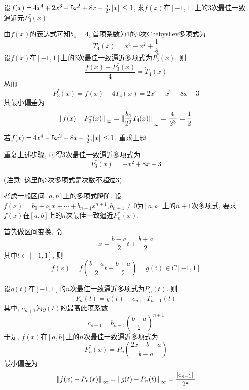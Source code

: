 \begin{example}
    设$f(x)=4x^4+2x^3-5x^2+8x-\frac{5}{2}, \abs*{x}\le 1$, 求$f(x)$在$[-1,1]$上的3次最佳一致逼近元$P_3^*(x)$
\end{example}
\begin{solution}
    由$f(x)$的表达式可知$b_4=4$, 首项系数为1的4次Chebyshev多项式为
    \begin{equation*}
        \widetilde{T}_4(x)=x^4-x^2+\frac{1}{8}
    \end{equation*}
    设$f(x)$在$[-1,1]$上的3次最佳一致逼近多项式为$P_3^*(x)$, 则
    \begin{equation*}
        \frac{f(x)-P_3^*(x)}{4}=\widetilde{T}_4(x)
    \end{equation*}
    从而
    \begin{equation*}
        P_3^*(x)=f(x)-4\widetilde{T}_4(x)=2x^3-x^2+8x-3
    \end{equation*}
    其最小偏差为
    \begin{equation*}
        \norm*{f(x)-P_3^*(x)}_\infty=\norm*{\frac{b_4}{2^3}T_4(x)}_\infty=\frac{\abs*{4}}{2^3}=\frac{1}{2}
    \end{equation*}
\end{solution}

\begin{example}
    若$f(x)=4x^4-5x^2+8x-\frac{5}{2}, \abs*{x}\le 1$, 重求上题
\end{example}
\begin{solution}
    重复上述步骤, 可得3次最佳一致逼近多项式为
    \begin{equation*}
        P_3^*(x)=-x^2+8x-3
    \end{equation*}

    (注意: 这里的3次多项式是次数不超过3)
\end{solution}

考虑一般区间$[a,b]$上的多项式降阶. 设$f(x)=b_0+b_1x+\cdots+b_{n+1}x^{n+1}, b_{n+1}\ne 0$为$[a,b]$上的$n+1$次多项式, 要求$f(x)$在$[a,b]$上的$n$次最佳一致逼近$P_n^*(x)$.

首先做区间变换, 令
\begin{equation*}
    x=\frac{b-a}{2}t+\frac{b+a}{2}
\end{equation*}
其中$t\in[-1,1]$, 则
\begin{equation*}
    f(x)=f\left(\frac{b-a}{2}t+\frac{b+a}{2}\right)=g(t)\in C[-1,1]
\end{equation*}

设$g(t)$在$[-1,1]$的$n$次最佳一致逼近多项式为$P_n(t)$, 则
\begin{equation*}
    P_n(t)=g(t)-c_{n+1}\widetilde{T}_{n+1}(t)
\end{equation*}
其中, $c_{n+1}$为$g(t)$的最高此项系数.
\begin{equation*}
    c_{n+1}=b_{n+1}\left(\frac{b-a}{2}\right)^{n+1}
\end{equation*}
于是, $f(x)$在$[a,b]$上的$n$次最佳一致逼近多项式为
\begin{equation*}
    P_n^*(x)=P_n\left(\frac{2x-b-a}{b-a}\right)
\end{equation*}
最小偏差为
\begin{equation*}
    \norm*{f(x)-P_n(x)}_\infty=\norm*{g(t)-P_n(t)}_\infty=\frac{\abs*{c_{n+1}}}{2^n}
\end{equation*}

